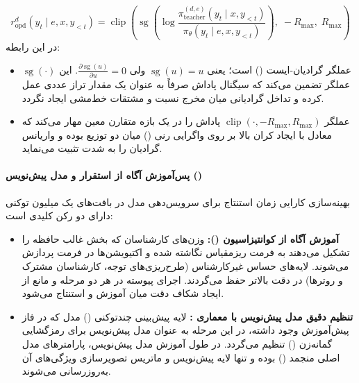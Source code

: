 \begin{equation}
    r_{\text{opd}}^d(y_t \mid e, x, y_{<t}) = \operatorname{clip}\left( \operatorname{sg}\left( \log \frac{\pi_{\text{teacher}}^{(d,e)}(y_t \mid x, y_{<t})}{\pi_\theta(y_t \mid e, x, y_{<t})} \right), \; -R_{\max}, \; R_{\max} \right)
\end{equation}
در این رابطه:
\begin{itemize}
    \item $\operatorname{sg}(\cdot)$ عملگر گرادیان-ایست () است؛ یعنی $\operatorname{sg}(u) = u$ ولی $\frac{\partial \operatorname{sg}(u)}{\partial u} = 0$. این عملگر تضمین می‌کند که سیگنال پاداش صرفاً به عنوان یک مقدار تراز عددی عمل کرده و تداخل گرادیانی میان مخرج نسبت و مشتقات خط‌مشی ایجاد نگردد.
    \item عملگر $\operatorname{clip}(\cdot, -R_{\max}, R_{\max})$ پاداش را در یک بازه متقارن معین مهار می‌کند که معادل با ایجاد کران بالا بر روی واگرایی رنی () میان دو توزیع بوده و واریانس گرادیان را به شدت تثبیت می‌نماید.
\end{itemize}

\paragraph*{پس‌آموزش آگاه از استقرار و مدل پیش‌نویس ()}
بهینه‌سازی کارایی زمان استنتاج برای سرویس‌دهی مدل در بافت‌های یک میلیون توکنی دارای دو رکن کلیدی است:
\begin{itemize}
    \item \textbf{آموزش آگاه از کوانتیزاسیون ():} وزن‌های کارشناسان  که بخش غالب حافظه را تشکیل می‌دهند به فرمت ریزمقیاس  \cite{rouhani2023microscaling} نگاشته شده و اکتیویشن‌ها در فرمت  پردازش می‌شوند. لایه‌های حساس غیرکارشناس (طرح‌ریزی‌های توجه، کارشناسان مشترک و روترها) در دقت بالاتر حفظ می‌گردند. اجرای پیوسته  در هر دو مرحله  و  مانع از ایجاد شکاف دقت میان آموزش و استنتاج می‌شود.
    \item \textbf{تنظیم دقیق مدل پیش‌نویس با معماری :} لایه پیش‌بینی چندتوکنی () مدل که در فاز پیش‌آموزش وجود داشته، در این مرحله به عنوان مدل پیش‌نویس برای رمزگشایی گمانه‌زن () \cite{li2025eagle3} تنظیم می‌گردد. در طول آموزش مدل پیش‌نویس، پارامترهای مدل اصلی منجمد () بوده و تنها لایه پیش‌نویس و ماتریس تصویرسازی ویژگی‌های آن به‌روزرسانی می‌شوند.
\end{itemize}

